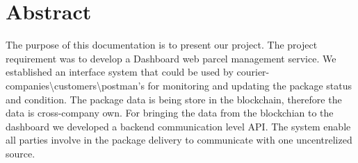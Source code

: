 \chapter*{Abstract}
\label{cha:abstract}

The purpose of this documentation is to present our project. The project requirement was to develop a Dashboard web parcel management service. We established an interface system that could be used by courier-companies\textbackslash customers\textbackslash postman's for monitoring and updating the package status and condition. The package data is being store in the blockchain, therefore the data is cross-company own. For bringing the data from the blockchian to the dashboard we developed a backend communication level API.
The system enable all parties involve in the package delivery to communicate with one uncentrelized source.